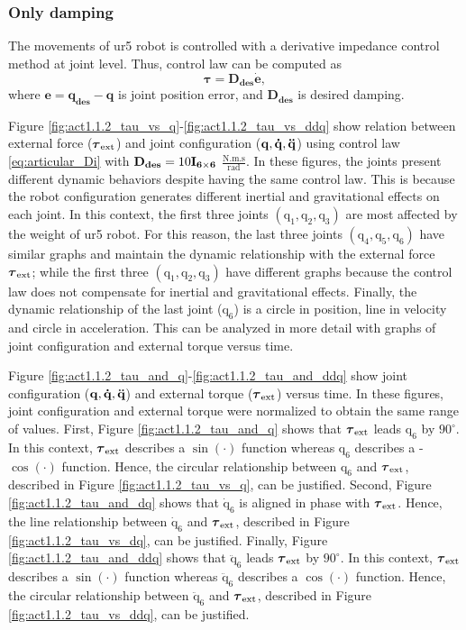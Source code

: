 \graphicspath{{images/act_1.1.2/}}
\subsubsection{Only damping}
The movements of ur5 robot is controlled with a derivative impedance control method at joint level. Thus, control law can be computed as 
\begin{equation}
	\boldsymbol{\tau}
	= \mathbf{D_{des} \dot{e}},
	\label{eq:articular_Di}
\end{equation}
\noindent where $\mathbf{e}=\mathbf{q_{des} - q}$ is joint position error, and $\mathbf{D_{des}}$ is desired damping. 

Figure \ref{fig:act1.1.2_tau_vs_q}-\ref{fig:act1.1.2_tau_vs_ddq} show relation between external force ($\boldsymbol{\tau}_\mathrm{ext}$) and joint configuration ($\mathbf{q, \dot{q}, \ddot{q}}$) using control law \eqref{eq:articular_Di} with $\mathbf{D_{des}}=10\mathbf{I_{6 \times 6}}$ $\mathrm{\frac{N.m.s}{rad}}$. In these figures, the joints present different dynamic behaviors despite having the same control law. This is because the robot configuration generates different inertial and gravitational effects on each joint. In this context, the first three joints $(\mathrm{q_1, q_2, q_3})$ are most affected by the weight of ur5 robot. For this reason, the last three joints $(\mathrm{q_4, q_5, q_6})$ have similar graphs and maintain the dynamic relationship with the external force $\boldsymbol{\tau}_\mathrm{ext}$; while the first three $(\mathrm{q_1, q_2, q_3})$ have different graphs because the control law does not compensate for inertial and gravitational effects. Finally, the dynamic relationship of the last joint ($\mathrm{q_6}$) is a circle in position, line in velocity and circle in acceleration. This can be analyzed in more detail with graphs of joint configuration and external torque versus time. 

Figure \ref{fig:act1.1.2_tau_and_q}-\ref{fig:act1.1.2_tau_and_ddq} show joint configuration ($\mathbf{q, \dot{q}, \ddot{q}}$) and external torque ($\boldsymbol{\tau}_\mathrm{ext}$) versus time. In these figures, joint configuration and external torque were normalized to obtain the same range of values\normalizenote. First, Figure \ref{fig:act1.1.2_tau_and_q} shows that $\boldsymbol{\tau}_\mathrm{ext}$ leads $\mathrm{q_6}$ by $90^{\circ}$. In this context, $\boldsymbol{\tau}_\mathrm{ext}$ describes a $\sin{(\cdot)}$ function whereas $\mathrm{q_6}$ describes a -$\cos{(\cdot)}$ function. Hence, the circular relationship between $\mathrm{q_6}$ and $\boldsymbol{\tau}_\mathrm{ext}$, described in Figure \ref{fig:act1.1.2_tau_vs_q}, can be justified. Second, Figure \ref{fig:act1.1.2_tau_and_dq} shows that $\mathrm{\dot{q}_6}$ is aligned in phase with $\boldsymbol{\tau}_\mathrm{ext}$. Hence, the line relationship between $\mathrm{\dot{q}_6}$ and $\boldsymbol{\tau}_\mathrm{ext}$, described in Figure \ref{fig:act1.1.2_tau_vs_dq}, can be justified. Finally, Figure \ref{fig:act1.1.2_tau_and_ddq} shows that $\mathrm{\ddot{q}_6}$ leads $\boldsymbol{\tau}_\mathrm{ext}$ by $90^{\circ}$. In this context, $\boldsymbol{\tau}_\mathrm{ext}$ describes a $\sin{(\cdot)}$ function whereas $\mathrm{\ddot{q}_6}$ describes a $\cos{(\cdot)}$ function. Hence, the circular relationship between $\mathrm{\ddot{q}_6}$ and $\boldsymbol{\tau}_\mathrm{ext}$, described in Figure \ref{fig:act1.1.2_tau_vs_ddq}, can be justified.

